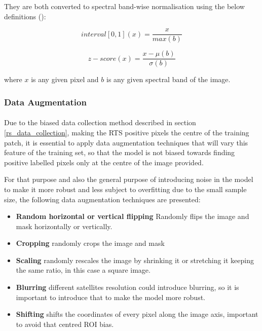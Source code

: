 They are both converted to spectral band-wise normalisation using the below definitions (\cite{BELENGUERPLOMER2021112468}):

\begin{equation} \label{eq_interval}
interval [0,1](x) = \frac{x}{max(b)}
\end{equation}

\begin{equation} \label{eq_z_score}
z-score(x) = \frac{x- \mu(b)}{\sigma(b)}
\end{equation}

where $x$ is any given pixel and $b$ is any given spectral band of the image.

\subsubsection{Data Augmentation} \label{img_aug}
\paragraph{}
Due to the biased data collection method described in section \ref{rs_data_collection}, making the \gls{RTS} positive pixels the centre of the training patch, it is essential to apply data augmentation techniques that will vary this feature of the training set, so that the model is not biased towards finding positive labelled pixels only at the centre of the image provided. 

For that purpose and also the general purpose of introducing noise in the model to make it more robust and less subject to overfitting due to the small sample size, the following data augmentation techniques are presented:

    \begin{itemize}
        \item \textbf{Random horizontal or vertical flipping} Randomly flips the image and mask horizontally or vertically.
        \item \textbf{Cropping} randomly crops the image and mask
        \item \textbf{Scaling} randomly rescales the image by shrinking it or stretching it keeping the same ratio, in this case a square image.
        \item \textbf{Blurring} different satellites resolution could introduce blurring, so it is important to introduce that to make the model more robust.
        \item \textbf{Shifting} shifts the coordinates of every pixel along the image axis, important to avoid that centred \gls{ROI} bias.
    \end{itemize}
